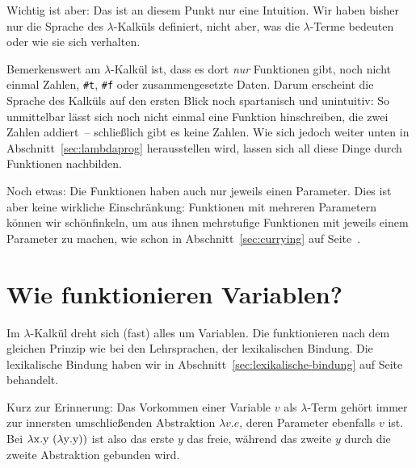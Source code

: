 Wichtig ist aber: Das ist an diesem Punkt nur eine Intuition.  Wir
haben bisher nur die Sprache des $\lambda$-Kalküls definiert, nicht
aber, was die $\lambda$-Terme bedeuten oder wie sie sich verhalten.

Bemerkenswert am $\lambda$-Kalkül ist, dass es dort \emph{nur}
Funktionen gibt, noch nicht einmal Zahlen, \lstinline{#t},
\lstinline{#f} oder
zusammengesetzte Daten.  Darum erscheint die Sprache des Kalküls auf den
ersten Blick noch spartanisch und unintuitiv: So unmittelbar lässt sich
noch nicht einmal eine Funktion hinschreiben, die zwei Zahlen addiert~--
schließlich gibt es keine Zahlen.  Wie sich jedoch weiter unten in
Abschnitt~\ref{sec:lambdaprog} herausstellen wird, lassen sich all diese
Dinge durch Funktionen nachbilden.

Noch etwas: Die Funktionen haben auch nur jeweils
einen Parameter.  Dies ist aber keine wirkliche Einschränkung:
Funktionen mit mehreren Parametern können wir
schönfinkeln, um aus ihnen mehrstufige
Funktionen mit jeweils einem Parameter zu machen, wie schon in
Abschnitt~\ref{sec:currying} auf Seite~\pageref{sec:currying}.

\section{Wie funktionieren Variablen?}

Im $\lambda$-Kalkül dreht sich (fast) alles um Variablen.  Die
funktionieren nach dem gleichen Prinzip wie bei den Lehrsprachen, der
lexikalischen Bindung.  Die lexikalische Bindung haben wir in
Abschnitt~\ref{sec:lexikalische-bindung} auf
Seite~\pageref{sec:lexikalische-bindung} behandelt.

Kurz zur
Erinnerung:  Das
Vorkommen einer Variable $v$ als $\lambda$-Term gehört immer zur
innersten umschließenden Abstraktion $\lambda v.e$, deren Parameter
ebenfalls $v$ ist.  Bei $\lambda \mathrm x.\mathrm y~(\lambda \mathrm y.\mathrm y))$ 
ist also das erste $y$ das freie, während das zweite $y$ durch
die zweite Abstraktion gebunden wird.


